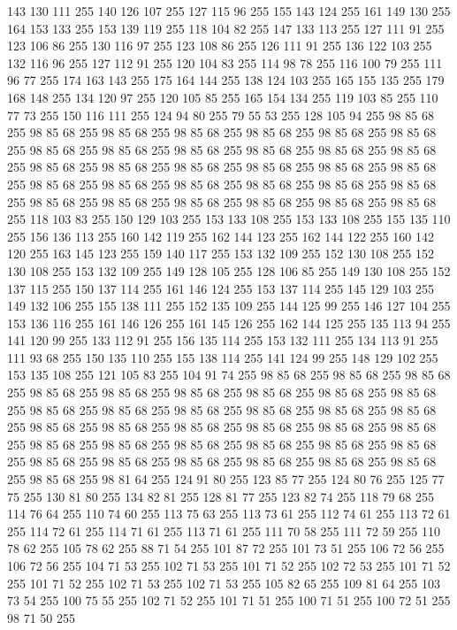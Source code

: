 143 130 111 255 140 126 107 255 127 115 96 255 155 143 124 255 161 149 130 255 164 153 133 255 153 139 119 255 118 104 82 255 147 133 113 255 127 111 91 255 123 106 86 255 130 116 97 255 123 108 86 255 126 111 91 255 136 122 103 255 132 116 96 255 127 112 91 255 120 104 83 255 114 98 78 255 116 100 79 255 111 96 77 255 174 163 143 255 175 164 144 255 138 124 103 255 165 155 135 255 179 168 148 255 134 120 97 255 120 105 85 255 165 154 134 255 119 103 85 255 110 77 73 255 150 116 111 255 124 94 80 255 79 55 53 255 128 105 94 255 98 85 68 255 98 85 68 255 98 85 68 255 98 85 68 255 98 85 68 255 98 85 68 255 98 85 68 255 98 85 68 255 98 85 68 255 98 85 68 255 98 85 68 255 98 85 68 255 98 85 68 255 98 85 68 255 98 85 68 255 98 85 68 255 98 85 68 255 98 85 68 255 98 85 68 255 98 85 68 255 98 85 68 255 98 85 68 255 98 85 68 255 98 85 68 255 98 85 68 255 98 85 68 255 98 85 68 255 98 85 68 255 98 85 68 255
98 85 68 255 98 85 68 255 118 103 83 255 150 129 103 255 153 133 108 255 153 133 108 255 155 135 110 255 156 136 113 255 160 142 119 255 162 144 123 255 162 144 122 255 160 142 120 255 163 145 123 255 159 140 117 255 153 132 109 255 152 130 108 255 152 130 108 255 153 132 109 255 149 128 105 255 128 106 85 255 149 130 108 255 152 137 115 255 150 137 114 255 161 146 124 255 153 137 114 255 145 129 103 255 149 132 106 255 155 138 111 255 152 135 109 255 144 125 99 255 146 127 104 255 153 136 116 255 161 146 126 255 161 145 126 255 162 144 125 255 135 113 94 255 141 120 99 255 133 112 91 255 156 135 114 255 153 132 111 255 134 113 91 255 111 93 68 255 150 135 110 255 155 138 114 255 141 124 99 255 148 129 102 255 153 135 108 255 121 105 83 255 104 91 74 255 98 85 68 255 98 85 68 255 98 85 68 255 98 85 68 255 98 85 68 255 98 85 68 255 98 85 68 255 98 85 68 255 98 85 68 255 98 85 68 255 98 85 68 255 98 85 68 255 98 85 68 255 98 85 68 255 98 85 68 255
98 85 68 255 98 85 68 255 98 85 68 255 98 85 68 255 98 85 68 255 98 85 68 255 98 85 68 255 98 85 68 255 98 85 68 255 98 85 68 255 98 85 68 255 98 85 68 255 98 85 68 255 98 85 68 255 98 85 68 255 98 85 68 255 98 85 68 255 98 85 68 255 98 85 68 255 98 81 64 255 124 91 80 255 123 85 77 255 124 80 76 255 125 77 75 255 130 81 80 255 134 82 81 255 128 81 77 255 123 82 74 255 118 79 68 255 114 76 64 255 110 74 60 255 113 75 63 255 113 73 61 255 112 74 61 255 113 72 61 255 114 72 61 255 114 71 61 255 113 71 61 255 111 70 58 255 111 72 59 255 110 78 62 255 105 78 62 255 88 71 54 255 101 87 72 255 101 73 51 255 106 72 56 255 106 72 56 255 104 71 53 255 102 71 53 255 101 71 52 255 102 72 53 255 101 71 52 255 101 71 52 255 102 71 53 255 102 71 53 255 105 82 65 255 109 81 64 255 103 73 54 255 100 75 55 255 102 71 52 255 101 71 51 255 100 71 51 255 100 72 51 255 98 71 50 255
